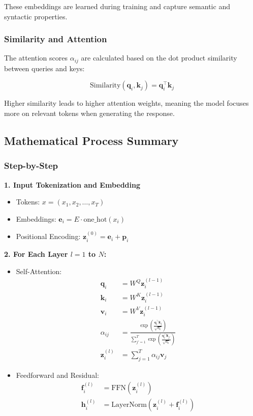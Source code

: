 \documentclass[12pt]{article}
\begin{document}
These embeddings are learned during training and capture semantic and syntactic properties.

\subsubsection{Similarity and Attention}

The attention scores \( \alpha_{ij} \) are calculated based on the dot product similarity between queries and keys:

\[
\text{Similarity}(\mathbf{q}_i, \mathbf{k}_j) = \mathbf{q}_i^\top \mathbf{k}_j
\]

Higher similarity leads to higher attention weights, meaning the model focuses more on relevant tokens when generating the response.

\subsection{Mathematical Process Summary}

\subsubsection{Step-by-Step}

\textbf{1. Input Tokenization and Embedding}

\begin{itemize}
    \item Tokens: \( x = (x_1, x_2, \dots, x_T) \)
    \item Embeddings: \( \mathbf{e}_i = E \cdot \text{one\_hot}(x_i) \)
    \item Positional Encoding: \( \mathbf{z}_i^{(0)} = \mathbf{e}_i + \mathbf{p}_i \)
\end{itemize}

\textbf{2. For Each Layer \( l = 1 \) to \( N \):}

\begin{itemize}
    \item Self-Attention:
    \[
    \begin{aligned}
    \mathbf{q}_i &= W^Q \mathbf{z}_i^{(l-1)} \\
    \mathbf{k}_i &= W^K \mathbf{z}_i^{(l-1)} \\
    \mathbf{v}_i &= W^V \mathbf{z}_i^{(l-1)} \\
    \alpha_{ij} &= \frac{\exp\left( \frac{\mathbf{q}_i^\top \mathbf{k}_j}{\sqrt{d_k}} \right)}{\sum_{j'=1}^{T} \exp\left( \frac{\mathbf{q}_i^\top \mathbf{k}_{j'}}{\sqrt{d_k}} \right)} \\
    \mathbf{z}_i^{(l)} &= \sum_{j=1}^{T} \alpha_{ij} \mathbf{v}_j
    \end{aligned}
    \]
    \item Feedforward and Residual:
    \[
    \begin{aligned}
    \mathbf{f}_i^{(l)} &= \text{FFN}(\mathbf{z}_i^{(l)}) \\
    \mathbf{h}_i^{(l)} &= \text{LayerNorm}(\mathbf{z}_i^{(l)} + \mathbf{f}_i^{(l)})
    \end{aligned}
    \]
\end{itemize}
\end{document}
